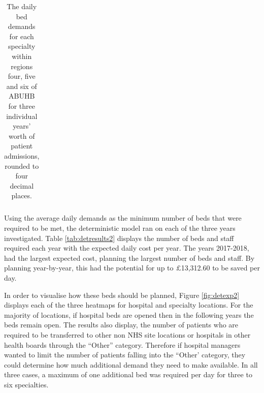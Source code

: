 \documentclass[../thesis.tex]{subfiles}
\begin{document}
\begin{landscape}
\begin{table}[h! ]
{\begin{tabular}{lcccccccccccccccccc}
    \end{tabular}}
    \caption{The daily bed demands for each specialty within regions four, five and six of ABUHB for three individual years' worth of patient admissions, rounded to four decimal places.}
    \label{tab:regionaldemandsexp2b}
\end{table}
\end{landscape}
\FloatBarrier
{}
Using the average daily demands as the minimum number of beds that were required to be met, the deterministic model ran on each of the three years investigated. Table \ref{tab:detresults2} displays the number of beds and staff required each year with the expected daily cost per year. The years 2017-2018, had the largest expected cost, planning the largest number of beds and staff. By planning year-by-year, this had the potential for up to $\pounds$13,312.60 to be saved per day. 


\begin{table}[h!]
    \centering{}
    \caption{The EV values for the $x^\textnormal{bed}$, $u^\textnormal{bed}$, $x^\textnormal{staff}$ and $u^\textnormal{staff}$ decision variables and the objective function value per year for Experiment 2.}
    \label{tab:detresults2}
\end{table}
\FloatBarrier
In order to visualise how these beds should be planned, Figure \ref{fig:detexp2} displays each of the three heatmaps for hospital and specialty locations. For the majority of locations, if hospital beds are opened then in the following years the beds remain open. The results also display, the number of patients who are required to be transferred to other non NHS site locations or hospitals in other health boards through the ``Other'' category. Therefore if hospital managers wanted to limit the number of patients falling into the ``Other' category, they could determine how much additional demand they need to make available. In all three cases, a maximum of one additional bed was required per day for three to six specialties.
\end{document}
